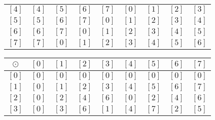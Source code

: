 \begin{enumerate}
\begin{enumerate}
\begin{tabular}{ c | c  c  c  c  c  c  c c}
$\left[ 4 \right]$ & $\left[ 4 \right]$ & $\left[ 5 \right]$ & $\left[ 6 \right]$ & 
$\left[ 7 \right]$ & $\left[ 0 \right]$ & $\left[ 1 \right]$ & $\left[ 2 \right]$ & 
$\left[ 3 \right]$  \\ 

$\left[ 5 \right]$ & $\left[ 5 \right]$ & $\left[ 6 \right]$ & $\left[ 7 \right]$ & 
$\left[ 0 \right]$ & $\left[ 1 \right]$ & $\left[ 2 \right]$ & $\left[ 3 \right]$ & 
$\left[ 4 \right]$  \\ 

$\left[ 6 \right]$ & $\left[ 6 \right]$ & $\left[ 7 \right]$ & $\left[ 0 \right]$ & 
$\left[ 1 \right]$ & $\left[ 2 \right]$ & $\left[ 3 \right]$ & $\left[ 4 \right]$ & 
$\left[ 5 \right]$  \\ 

$\left[ 7 \right]$ & $\left[ 7 \right]$ & $\left[ 0 \right]$ & $\left[ 1 \right]$ & 
$\left[ 2 \right]$ & $\left[ 3 \right]$ & $\left[ 4 \right]$ & $\left[ 5 \right]$ & 
$\left[ 6 \right]$  \\ 
\end{tabular}

\vskip 9pt

\begin{tabular}{ c | c  c  c  c  c  c  c c}
$\odot$ & $\left[ 0 \right]$ & $\left[ 1 \right]$ & $\left[ 2 \right]$ & $\left[ 3 \right]$ & 
$\left[ 4 \right]$ & $\left[ 5 \right]$ & $\left[ 6 \right]$ & $\left[ 7 \right]$  \\ \hline

$\left[ 0 \right]$ & $\left[ 0 \right]$ & $\left[ 0 \right]$ & $\left[ 0 \right]$ & 
$\left[ 0 \right]$ & $\left[ 0 \right]$ & $\left[ 0 \right]$ & $\left[ 0 \right]$ & 
$\left[ 0 \right]$  \\ 

$\left[ 1 \right]$ & $\left[ 0 \right]$ & $\left[ 1 \right]$ & $\left[ 2 \right]$ & 
$\left[ 3 \right]$ & $\left[ 4 \right]$ & $\left[ 5 \right]$ & $\left[ 6 \right]$ & 
$\left[ 7 \right]$ \\ 

$\left[ 2 \right]$ & $\left[ 0 \right]$ & $\left[ 2 \right]$ & $\left[ 4 \right]$ & 
$\left[ 6 \right]$ & $\left[ 0 \right]$ & $\left[ 2 \right]$ & $\left[ 4 \right]$ & 
$\left[ 6 \right]$  \\ 

$\left[ 3 \right]$ & $\left[ 0 \right]$ & $\left[ 3 \right]$ & $\left[ 6 \right]$ & 
$\left[ 1 \right]$ & $\left[ 4 \right]$ & $\left[ 7 \right]$ & $\left[ 2 \right]$ & 
$\left[ 5 \right]$  \\ 


\end{tabular}
\end{enumerate}
\end{enumerate}
